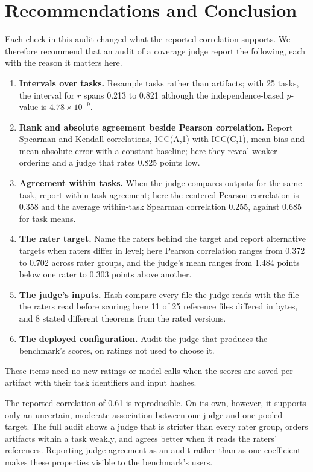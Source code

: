 \section{Recommendations and Conclusion}
\label{sec:discussion}
Each check in this audit changed what the reported correlation supports.
We therefore recommend that an audit of a coverage judge report the following, each with the reason it matters here.
\begin{enumerate}
\item \textbf{Intervals over tasks.} Resample tasks rather than artifacts; with 25 tasks, the interval for $r$ spans 0.213 to 0.821 although the independence-based $p$-value is $4.78\times10^{-9}$.
\item \textbf{Rank and absolute agreement beside Pearson correlation.} Report Spearman and Kendall correlations, ICC(A,1) with ICC(C,1), mean bias and mean absolute error with a constant baseline; here they reveal weaker ordering and a judge that rates 0.825 points low.
\item \textbf{Agreement within tasks.} When the judge compares outputs for the same task, report within-task agreement; here the centered Pearson correlation is 0.358 and the average within-task Spearman correlation 0.255, against 0.685 for task means.
\item \textbf{The rater target.} Name the raters behind the target and report alternative targets when raters differ in level; here Pearson correlation ranges from 0.372 to 0.702 across rater groups, and the judge's mean ranges from 1.484 points below one rater to 0.303 points above another.
\item \textbf{The judge's inputs.} Hash-compare every file the judge reads with the file the raters read before scoring; here 11 of 25 reference files differed in bytes, and 8 stated different theorems from the rated versions.
\item \textbf{The deployed configuration.} Audit the judge that produces the benchmark's scores, on ratings not used to choose it.
\end{enumerate}
These items need no new ratings or model calls when the scores are saved per artifact with their task identifiers and input hashes.

The reported correlation of 0.61 is reproducible.
On its own, however, it supports only an uncertain, moderate association between one judge and one pooled target.
The full audit shows a judge that is stricter than every rater group, orders artifacts within a task weakly, and agrees better when it reads the raters' references.
Reporting judge agreement as an audit rather than as one coefficient makes these properties visible to the benchmark's users.
